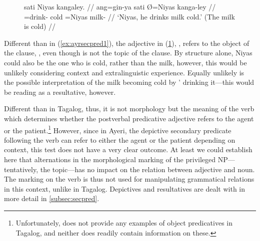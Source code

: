 \begin{figure}
\ex\label{ex:ayrsecpred2}
\begingl[aboveglcskip=1.5em, aboveglftskip=1.75em]
	 sati Niyas kangaley. //
	\glb ang=gin-ya sati Ø=Niyas kanga-ley //
	\glc \AgtT{}=drink-\TsgM{}
		cold
		\Top{}=Niyas%
		milk-\PargI{}%
			 //
	\glft `Niyas, he drinks milk cold.' (The milk is cold) //
\endgl
{}
\xe
\end{figure}

Different than in (\ref{ex:ayrsecpred1}), the adjective in
(\ref{ex:ayrsecpred2}), , refers to the object of the
clause, , even though  is not
the topic of the clause. By structure alone, Niyas could also be the one who is
cold, rather than the milk, however, this would be unlikely considering context
and extralinguistic experience. Equally unlikely is the possible interpretation
of the milk becoming cold by ' drinking it---this would be
reading  as a resultative, however.

Different than in Tagalog, thus, it is not morphology but the meaning of the
verb which determines whether the postverbal predicative adjective refers to
the agent or the patient.\footnote{Unfortunately, \citet{kroeger1991} does not
provide any examples of object predicatives in Tagalog, and neither does
\citet{schachterotanes1972} readily contain information on these.} However,
since in Ayeri, the depictive secondary predicate following the verb can refer
to either the agent or the patient depending on context, this test does not
have a very clear outcome. At least we could establish here that alternations
in the morphological marking of the privileged NP---tentatively, the
topic---has no impact on the relation between adjective and noun. The marking
on the verb is thus not used for manipulating grammatical relations in this
context, unlike in Tagalog. Depictives and resultatives are dealt with in more
detail in \autoref{subsec:secpred}.

